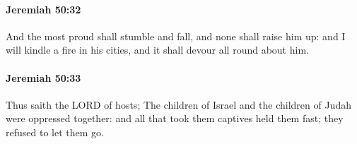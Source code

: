 		\paragraph{Jeremiah 50:32} %
			\label{JEREMIAH-50-32}

			And the most proud shall stumble and fall, and none shall raise him up: and I will kindle a fire in his cities, and it shall devour all round about him.


		\paragraph{Jeremiah 50:33} %
			\label{JEREMIAH-50-33}

			Thus saith the LORD of hosts; The children of Israel and the children of Judah were oppressed together: and all that took them captives held them fast; they refused to let them go.


